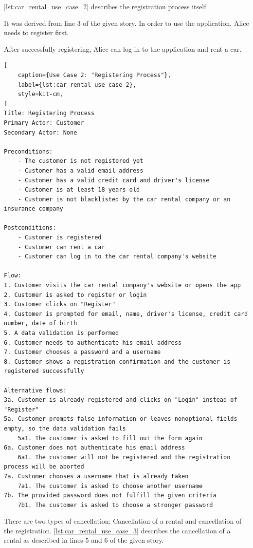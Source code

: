 \autoref{lst:car_rental_use_case_2} describes the registration process itself.

It was derived from line 3 of the given story.
In order to use the application, Alice needs to register first.

After successfully registering, Alice can log in to the application and rent a car.

\begin{lstlisting}[
    caption={Use Case 2: "Registering Process"},
    label={lst:car_rental_use_case_2},
    style=kit-cm,
]
Title: Registering Process
Primary Actor: Customer
Secondary Actor: None

Preconditions:
    - The customer is not registered yet
    - Customer has a valid email address
    - Customer has a valid credit card and driver's license
    - Customer is at least 18 years old
    - Customer is not blacklisted by the car rental company or an insurance company

Postconditions:
    - Customer is registered
    - Customer can rent a car
    - Customer can log in to the car rental company's website

Flow:
1. Customer visits the car rental company's website or opens the app 
2. Customer is asked to register or login
3. Customer clicks on "Register"
4. Customer is prompted for email, name, driver's license, credit card number, date of birth
5. A data validation is performed
6. Customer needs to authenticate his email address
7. Customer chooses a password and a username
8. Customer shows a registration confirmation and the customer is registered successfully 

Alternative flows:
3a. Customer is already registered and clicks on "Login" instead of "Register"
5a. Customer prompts false information or leaves nonoptional fields empty, so the data validation fails
    5a1. The customer is asked to fill out the form again
6a. Customer does not authenticate his email address
    6a1. The customer will not be registered and the registration process will be aborted
7a. Customer chooses a username that is already taken
    7a1. The customer is asked to choose another username
7b. The provided password does not fulfill the given criteria
    7b1. The customer is asked to choose a stronger password
\end{lstlisting}

There are two types of cancellation: Cancellation of a rental and cancellation of the registration.
\autoref{lst:car_rental_use_case_3} describes the cancellation of a rental as described in lines 5 and 6 of the given story.

